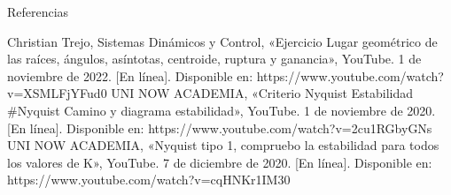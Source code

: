 \documentclass{beamer}
\begin{document}
\begin{frame}{Referencias}
\begin{justify}
\begin{itemize}
\justifying
[1] Christian Trejo, Sistemas Dinámicos y Control, «Ejercicio Lugar geométrico de las raíces, ángulos, asíntotas, centroide, ruptura y ganancia», YouTube. 1 de noviembre de 2022. [En línea]. Disponible en: https://www.youtube.com/watch?v=XSMLFjYFud0
\break
[2] UNI NOW ACADEMIA, «Criterio Nyquist Estabilidad #Nyquist Camino y diagrama estabilidad», YouTube. 1 de noviembre de 2020. [En línea]. Disponible en: https://www.youtube.com/watch?v=2cu1RGbyGNs
\break
[3] UNI NOW ACADEMIA, «Nyquist tipo 1, compruebo la estabilidad para todos los valores de K», YouTube. 7 de diciembre de 2020. [En línea]. Disponible en: https://www.youtube.com/watch?v=cqHNKr1IM30
\end{itemize}
\end{justify}
\end{frame}
 
\end{document}
